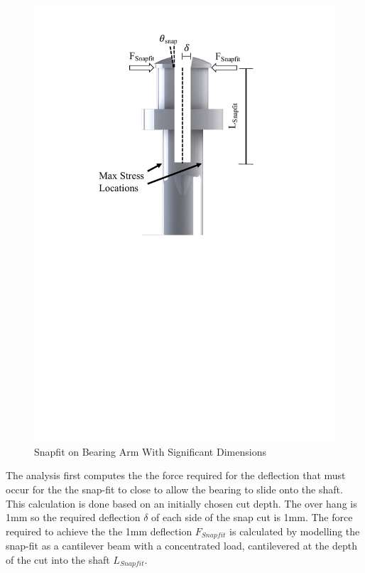 \documentclass[../main.tex]{subfiles}
\begin{document}
\begin{figure}[H]
	\centering
	\includegraphics[width=1\textwidth]{img/gondola/Snapfit.pdf}
	\caption{Snapfit on Bearing Arm With Significant Dimensions }
	\label{fig:Snapfit}
\end{figure}

The analysis first computes the the force required for the deflection that must occur for the the snap-fit to close to allow the bearing to slide onto the shaft. This calculation is done based on an initially chosen cut depth. The over hang is 1mm so the required deflection $\delta$ of each side of the snap cut is 1mm. The force required to achieve the the 1mm deflection $F_{Snapfit}$ is calculated by modelling the snap-fit as a cantilever beam with a concentrated load, cantilevered at the depth of the cut into the shaft $L_{Snapfit}$. 
\end{document}
